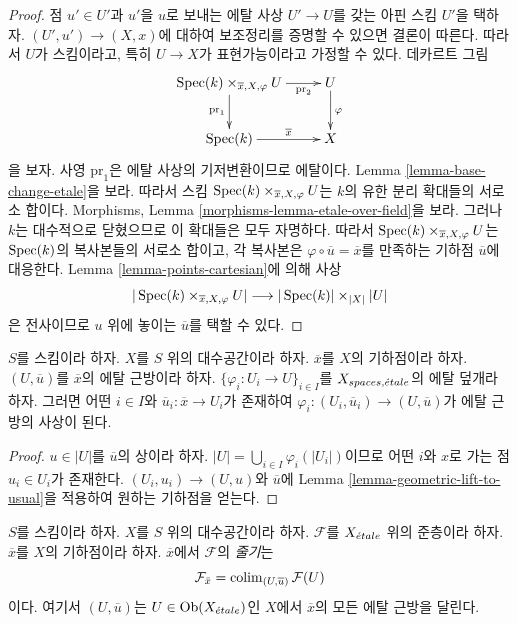 \begin{proof}
점 $u' \in U'$과 $u'$을 $u$로 보내는 에탈 사상
$U' \to U$를 갖는 아핀 스킴 $U'$을 택하자.
$(U', u') \to (X, x)$에 대하여 보조정리를 증명할 수 있으면
결론이 따른다. 따라서 $U$가 스킴이라고, 특히
$U \to X$가 표현가능이라고 가정할 수 있다.
데카르트 그림
$$
\xymatrix{
\Spec(k) \times_{\overline{x}, X, \varphi} U
\ar[d]_{\text{pr}_1} \ar[r]_-{\text{pr}_2} & U
\ar[d]^\varphi \\
\Spec(k) \ar[r]^-{\overline{x}} & X
}
$$
을 보자.
사영 $\text{pr}_1$은 에탈 사상의 기저변환이므로 에탈이다.
Lemma \ref{lemma-base-change-etale}을 보라.
따라서 스킴 $\mathop{\mathrm{Spec}}(k) \times_{\overline{x}, X, \varphi} U$는
$k$의 유한 분리 확대들의 서로소 합이다. Morphisms, Lemma
\ref{morphisms-lemma-etale-over-field}을 보라.
그러나 $k$는 대수적으로 닫혔으므로 이 확대들은 모두 자명하다.
따라서 $\mathop{\mathrm{Spec}}(k) \times_{\overline{x}, X, \varphi} U$는
$\mathop{\mathrm{Spec}}(k)$의 복사본들의 서로소 합이고, 각 복사본은
$\varphi \circ \overline{u} = \overline{x}$를 만족하는 기하점
$\overline{u}$에 대응한다. Lemma \ref{lemma-points-cartesian}에 의해
사상
$$
|\mathop{\mathrm{Spec}}(k) \times_{\overline{x}, X, \varphi} U|
\longrightarrow
|\mathop{\mathrm{Spec}}(k)| \times_{|X|} |U|
$$
은 전사이므로 $u$ 위에 놓이는 $\overline{u}$를 택할 수 있다.
\end{proof}

\begin{lemma}
\label{lemma-geometric-lift-to-cover}
$S$를 스킴이라 하자. $X$를 $S$ 위의 대수공간이라 하자.
$\overline{x}$를 $X$의 기하점이라 하자.
$(U, \overline{u})$를 $\overline{x}$의 에탈 근방이라 하자.
$\{\varphi_i : U_i \to U\}_{i \in I}$를
$X_{spaces, {\acute{e}tale}}$의 에탈 덮개라 하자.
그러면 어떤 $i \in I$와 $\overline{u}_i : \overline{x} \to U_i$가
존재하여 $\varphi_i : (U_i, \overline{u}_i) \to (U, \overline{u})$가
에탈 근방의 사상이 된다.
\end{lemma}

\begin{proof}
$u \in |U|$를 $\overline{u}$의 상이라 하자.
$|U| = \bigcup_{i \in I} \varphi_i(|U_i|)$이므로 어떤 $i$와
$x$로 가는 점 $u_i \in U_i$가 존재한다.
$(U_i, u_i) \to (U, u)$와 $\overline{u}$에 Lemma
\ref{lemma-geometric-lift-to-usual}을 적용하여 원하는 기하점을 얻는다.
\end{proof}

\begin{definition}
\label{definition-stalk}
$S$를 스킴이라 하자. $X$를 $S$ 위의 대수공간이라 하자.
$\mathcal{F}$를 $X_{\acute{e}tale}$ 위의 준층이라 하자.
$\overline{x}$를 $X$의 기하점이라 하자.
$\overline{x}$에서 $\mathcal{F}$의 {\it 줄기}는
$$
\mathcal{F}_{\bar x}
=
\mathop{\mathrm{colim}}\nolimits_{(U, \overline{u})} \mathcal{F}(U)
$$
이다. 여기서 $(U, \overline{u})$는
$U \in \mathop{\mathrm{Ob}}\nolimits(X_{\acute{e}tale})$인 $X$에서 $\overline{x}$의 모든 에탈 근방을
달린다.
\end{definition}

